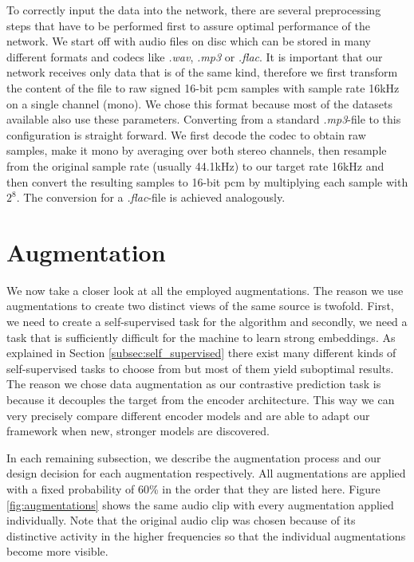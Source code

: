 To correctly input the data into the network, there are several preprocessing steps that have to be performed first to assure optimal performance of the network. We start off with audio files on disc which can be stored in many different formats and codecs like \textit{.wav}, \textit{.mp3} or \textit{.flac}. It is important that our network receives only data that is of the same kind, therefore we first transform the content of the file to raw signed 16-bit \gls{pcm} samples with sample rate 16kHz on a single channel (mono). We chose this format because most of the datasets available also use these parameters. Converting from a standard \textit{.mp3}-file to this configuration is straight forward. We first decode the codec to obtain raw samples, make it mono by averaging over both stereo channels, then resample from the original sample rate (usually 44.1kHz) to our target rate 16kHz and then convert the resulting samples to 16-bit \gls{pcm} by multiplying each sample with $2^8$. The conversion for a \textit{.flac}-file is achieved analogously.

\section{Augmentation}\label{sec:augmentation}

We now take a closer look at all the employed augmentations. The reason we use augmentations to create two distinct views of the same source is twofold. First, we need to create a self-supervised task for the algorithm and secondly, we need a task that is sufficiently difficult for the machine to learn strong embeddings. As explained in Section \ref{subsec:self_supervised} there exist many different kinds of self-supervised tasks to choose from but most of them yield suboptimal results. The reason we chose data augmentation as our contrastive prediction task is because it decouples the target from the encoder architecture. This way we can very precisely compare different encoder models and are able to adapt our framework when new, stronger models are discovered.

In each remaining subsection, we describe the augmentation process and our design decision for each augmentation respectively. All augmentations are applied with a fixed probability of 60\% in the order that they are listed here. Figure \ref{fig:augmentations} shows the same audio clip with every augmentation applied individually. Note that the original audio clip was chosen because of its distinctive activity in the higher frequencies so that the individual augmentations become more visible.

